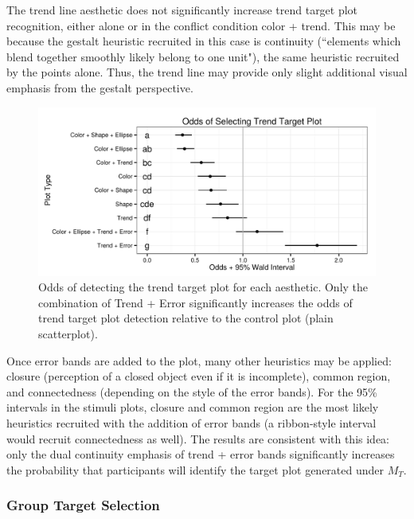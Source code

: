 \documentclass[11pt]{isuthesis}\usepackage[]{graphicx}\usepackage[]{color}
\newenvironment{knitrout}{}{} %
\begin{document}
The trend line aesthetic does not significantly increase trend target plot recognition, either alone or in the conflict condition color + trend. This may be because the gestalt heuristic recruited in this case is continuity (``elements which blend together smoothly likely belong to one unit"), the same heuristic recruited by the points alone. Thus, the trend line may provide only slight additional visual emphasis from the gestalt perspective.

\begin{figure}[htbp]\centering
\begin{knitrout}
\color{fgcolor}

{\centering \includegraphics[width=.75\linewidth]{Figure/FeatureHierarchy/fig-line-fixef-1} 

}



\end{knitrout}
\caption[Odds of detecting the trend target plot for each aesthetic]{Odds of detecting the trend target plot for each aesthetic. Only the combination of Trend + Error significantly increases the odds of trend target plot detection relative to the control plot (plain scatterplot). \label{fig:linear.fixef}}
\end{figure}

Once error bands are added to the plot, many other heuristics may be applied: closure (perception of a closed object even if it is incomplete), common region, and connectedness (depending on the style of the error bands). For the 95\% intervals in the stimuli plots, closure and common region are the most likely heuristics recruited with the addition of error bands (a ribbon-style interval would recruit connectedness as well). The results are consistent with this idea: only the dual continuity emphasis of trend + error bands significantly increases the probability that participants will identify the target plot generated under $M_T$. 

\subsubsection{Group Target Selection}\label{sec:groupModel}
\end{document}
